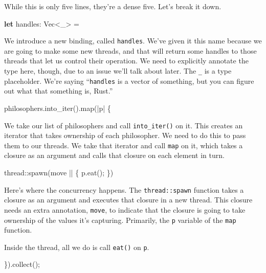 \documentclass[a4paper,]{book}
\newenvironment{Shaded}{\begin{snugshade}}{\end{snugshade}}
\newcommand{\KeywordTok}[1]{\textcolor[rgb]{0.13,0.29,0.53}{\textbf{{#1}}}}
\newcommand{\NormalTok}[1]{{#1}}
\begin{document}
While this is only five lines, they're a dense five. Let's break it
down.

\begin{Shaded}
\begin{Highlighting}[]
\KeywordTok{let} \NormalTok{handles: Vec<_> = }
\end{Highlighting}
\end{Shaded}

We introduce a new binding, called \texttt{handles}. We've given it this
name because we are going to make some new threads, and that will return
some handles to those threads that let us control their operation. We
need to explicitly annotate the type here, though, due to an issue we'll
talk about later. The \texttt{\_} is a type placeholder. We're saying
``\texttt{handles} is a vector of something, but you can figure out what
that something is, Rust.''

\begin{Shaded}
\begin{Highlighting}[]
\NormalTok{philosophers.into_iter().map(|p| \{}
\end{Highlighting}
\end{Shaded}

We take our list of philosophers and call \texttt{into\_iter()} on it.
This creates an iterator that takes ownership of each philosopher. We
need to do this to pass them to our threads. We take that iterator and
call \texttt{map} on it, which takes a closure as an argument and calls
that closure on each element in turn.

\begin{Shaded}
\begin{Highlighting}[]
    \NormalTok{thread::spawn(move || \{}
        \NormalTok{p.eat();}
    \NormalTok{\})}
\end{Highlighting}
\end{Shaded}

Here's where the concurrency happens. The \texttt{thread::spawn}
function takes a closure as an argument and executes that closure in a
new thread. This closure needs an extra annotation, \texttt{move}, to
indicate that the closure is going to take ownership of the values it's
capturing. Primarily, the \texttt{p} variable of the \texttt{map}
function.

Inside the thread, all we do is call \texttt{eat()} on \texttt{p}.

\begin{Shaded}
\begin{Highlighting}[]
\NormalTok{\}).collect();}
\end{Highlighting}
\end{Shaded}
\end{document}
